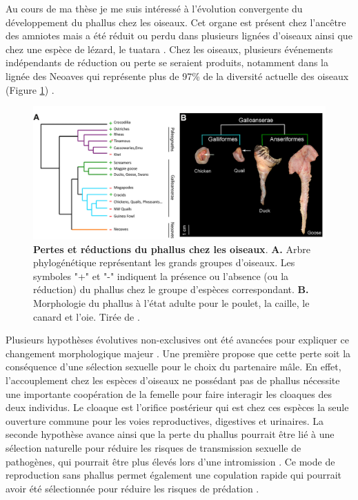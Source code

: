 Au cours de ma thèse je me suis intéressé à l’évolution convergente du développement du phallus chez les oiseaux. Cet organe est présent chez l’ancêtre des amniotes mais a été réduit ou perdu dans plusieurs lignées d’oiseaux ainsi que chez une espèce de lézard, le tuatara \citep{brennan_independent_2008, sanger_resurrecting_2015}. Chez les oiseaux, plusieurs événements indépendants de réduction ou perte se seraient produits, notamment dans la lignée des Neoaves qui représente plus de 97\% de la diversité actuelle des oiseaux (Figure \ref{fig:chap4-fig-herrera}) \citep{brennan_independent_2008, feng_dense_2020}.\\

\begin{figure}[hbt!]
 \centering
 \includegraphics[width=1\textwidth, page=1]{figures/IPLOSS/Herrera2013_fig1.png}
 \caption[Pertes et réductions du phallus chez les oiseaux]{
 \textbf{Pertes et réductions du phallus chez les oiseaux}.
 \textbf{A.} Arbre phylogénétique représentant les grands groupes d'oiseaux. Les symboles "+" et "-" indiquent la présence ou l'absence (ou la réduction) du phallus chez le groupe d'espèces correspondant. 
 \textbf{B.} Morphologie du phallus à l'état adulte pour le poulet, la caille, le canard et l'oie.
 Tirée de \citet{herrera_developmental_2013}.
 \\
 }
 \label{fig:chap4-fig-herrera}
\end{figure} 

Plusieurs hypothèses évolutives non-exclusives ont été avancées pour expliquer ce changement morphologique majeur \citep{briskie_sexual_1997}. Une première propose que cette perte soit la conséquence d’une sélection sexuelle pour le choix du partenaire mâle. En effet, l’accouplement chez les espèces d’oiseaux ne possédant pas de phallus nécessite une importante coopération de la femelle pour faire interagir les cloaques des deux individus. Le cloaque est l’orifice postérieur qui est chez ces espèces la seule ouverture commune pour les voies reproductives, digestives et urinaires. La seconde hypothèse avance ainsi que la perte du phallus pourrait être lié à une sélection naturelle pour réduire les risques de transmission sexuelle de pathogènes, qui pourrait être plus élevés lors d’une intromission \citep{briskie_sexual_1997}. Ce mode de reproduction sans phallus permet également une copulation rapide qui pourrait avoir été sélectionnée pour réduire les risques de prédation \citep{wesotowski_reduction_1999}.\\

